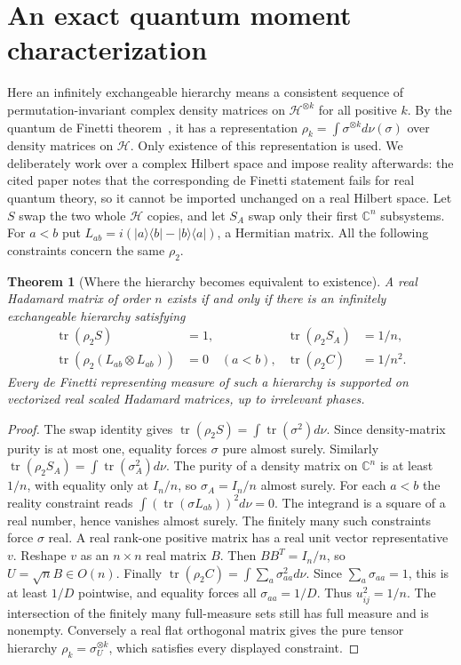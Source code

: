 \documentclass[11pt]{article}
\newtheorem{theorem}{Theorem}
\newcommand{\tr}{\operatorname{tr}}
\begin{document}
\section{An exact quantum moment characterization}
Here an infinitely exchangeable hierarchy means a consistent sequence
of permutation-invariant complex density matrices on
$\mathcal H^{\otimes k}$ for all positive $k$. By the quantum de Finetti
theorem~\cite{CFS}, it has a representation
$\rho_k=\int\sigma^{\otimes k}d\nu(\sigma)$ over density matrices on
$\mathcal H$. Only existence of this representation is used.
We deliberately work over a complex Hilbert space and impose reality
afterwards: the cited paper notes that the corresponding de Finetti
statement fails for real quantum theory, so it cannot be imported
unchanged on a real Hilbert space.
Let $S$ swap the two whole $\mathcal H$ copies, and let $S_A$ swap
only their first $\mathbb C^n$ subsystems. For $a<b$ put
$L_{ab}=i(|a\rangle\langle b|-|b\rangle\langle a|)$, a Hermitian
matrix. All the following constraints concern the same $\rho_2$.
\begin{theorem}[Where the hierarchy becomes equivalent to existence]
A real Hadamard matrix of order $n$ exists if and only if there is
an infinitely exchangeable hierarchy satisfying
\begin{align*}
 \tr(\rho_2S)&=1,& \tr(\rho_2S_A)&=1/n,\\
 \tr(\rho_2(L_{ab}\otimes L_{ab}))&=0\quad(a<b),&
 \tr(\rho_2 C)&=1/n^2.
\end{align*}
Every de Finetti representing measure of such a hierarchy is supported
on vectorized real scaled Hadamard matrices, up to irrelevant phases.
\end{theorem}
\begin{proof}
The swap identity gives $\tr(\rho_2S)=\int\tr(\sigma^2)d\nu$.
Since density-matrix purity is at most one, equality forces $\sigma$
pure almost surely. Similarly
$\tr(\rho_2S_A)=\int\tr(\sigma_A^2)d\nu$. The purity of a density
matrix on $\mathbb C^n$ is at least $1/n$, with equality only at
$I_n/n$, so $\sigma_A=I_n/n$ almost surely.
For each $a<b$ the reality constraint reads
$\int(\tr(\sigma L_{ab}))^2d\nu=0$. The integrand is a square of a
real number, hence vanishes almost surely. The finitely many such
constraints force $\sigma$ real. A real rank-one positive matrix has
a real unit vector representative $v$. Reshape $v$ as an $n\times n$
real matrix $B$. Then $BB^T=I_n/n$, so $U=\sqrt nB\in O(n)$.
Finally $\tr(\rho_2 C)=\int\sum_a\sigma_{aa}^2d\nu$.
Since $\sum_a\sigma_{aa}=1$, this is at least $1/D$ pointwise,
and equality forces all $\sigma_{aa}=1/D$. Thus $u_{ij}^2=1/n$.
The intersection of the finitely many full-measure sets still has
full measure and is nonempty. Conversely a real flat orthogonal
matrix gives the pure tensor hierarchy $\rho_k=\sigma_U^{\otimes k}$,
which satisfies every displayed constraint.
\end{proof}
\end{document}
